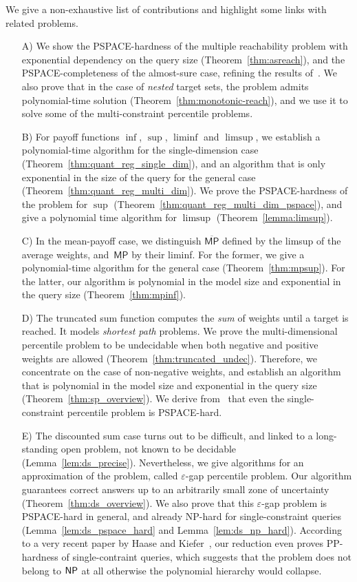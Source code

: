 \documentclass{llncs}
\newcommand*{\mpsup}{\ensuremath{\overline{\mathsf{MP}}}}
\newcommand*{\mpinf}{\ensuremath{\underline{\mathsf{MP}}}}
\newcommand\NPTIME{\textrm{\sf NP}}
\newcommand\PSPACE{\textrm{\sf PSPACE}}
\begin{document}
We give a non-exhaustive list of contributions and highlight some links with related problems. 
\begin{itemize}
\item[A)] We show the \PSPACE-hardness of the multiple reachability problem with exponential dependency on the query size (Theorem~\ref{thm:asreach}), and
the \PSPACE-completeness of the almost-sure case, refining the results of~\cite{EKVY-lmcs08}. We also prove that in the case of \emph{nested} target sets, the problem admits polynomial-time solution (Theorem~\ref{thm:monotonic-reach}), and we use it to solve some of the multi-constraint percentile problems.
\item[B)] For payoff functions $\inf$, $\sup$, $\liminf$ and $\limsup$, we establish a polynomial-time algorithm for the single-dimension case (Theorem~\ref{thm:quant_reg_single_dim}), and an algorithm that is only exponential in the size of the query for the general case (Theorem~\ref{thm:quant_reg_multi_dim}).
We prove the \PSPACE-hardness of the problem for $\sup$ (Theorem~\ref{thm:quant_reg_multi_dim_pspace}), and give a polynomial time algorithm for $\limsup$ 
(Theorem~\ref{lemma:limsup}).
\item[C)] In the mean-payoff case, we distinguish $\mpsup$ defined by the limsup of the average weights, and~$\mpinf$ by their liminf. For the former, we give a polynomial-time algorithm for the general case (Theorem~\ref{thm:mpsup}). For the latter, our algorithm is polynomial in the model size and exponential in the query size (Theorem~\ref{thm:mpinf}).
\item[D)] The truncated sum function computes the \emph{sum} of weights until a target is reached. It models \emph{shortest path} problems. We prove the multi-dimensional percentile problem to be undecidable when both negative and positive weights are allowed (Theorem~\ref{thm:truncated_undec}). Therefore, we concentrate on the case of non-negative weights, and establish an algorithm that is polynomial in the model size and exponential in the query size (Theorem~\ref{thm:sp_overview}). We derive from~\cite{HaaseK14} that even the single-constraint percentile problem is \PSPACE-hard.
\item[E)] The discounted sum case turns out to be difficult, and linked to a long-standing open problem, not known to be decidable (Lemma~\ref{lem:ds_precise}). Nevertheless, we give algorithms for an approximation of the problem, called $\varepsilon$-gap percentile problem. Our algorithm guarantees correct answers up to an arbitrarily small zone of uncertainty (Theorem~\ref{thm:ds_overview}). We also prove that this $\varepsilon$-gap problem is \PSPACE-hard in general, and already \NPTIME-hard for single-constraint queries (Lemma~\ref{lem:ds_pspace_hard} and Lemma~\ref{lem:ds_np_hard}). According to a very recent paper by Haase and Kiefer~\cite{HaasePP}, our reduction even proves \textsf{PP}-hardness of single-contraint queries, which suggests that the problem does not belong to $\NPTIME$ at all otherwise the polynomial hierarchy would collapse.
\end{itemize}
\end{document}
